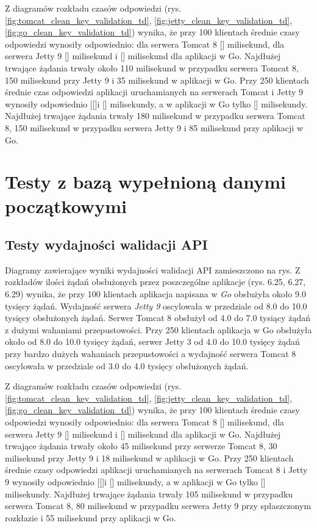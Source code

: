 Z diagramów rozkładu czasów odpowiedzi (rys. \ref{fig:tomcat_clean_key_validation_td}, \ref{fig:jetty_clean_key_validation_td}, \ref{fig:go_clean_key_validation_td}) wynika, że przy 100 klientach średnie czasy odpowiedzi wynosiły odpowiednio: dla serwera Tomcat 8 [] milisekund, dla serwera Jetty 9 [] milisekund i [] milisekund dla aplikacji w Go.  Najdłużej trwające żądania trwały około 110 milisekund w przypadku serwera Tomcat 8, 150 milisekund przy Jetty 9 i 35 milisekund  w aplikacji w Go. Przy 250 klientach średnie czas odpowiedzi aplikacji uruchamianych na serwerach Tomcat i Jetty 9  wynosiły  odpowiednio [[]i [] milisekundy, a w aplikacji w Go tylko [] milisekundy. Najdłużej trwające żądania trwały 180 milisekund w przypadku serwera Tomcat 8, 150 milisekund w przypadku serwera Jetty 9 i 85 milisekund przy aplikacji w Go. 

% 
\clearpage

\newpage
\section{Testy z bazą wypełnioną danymi początkowymi}
\subsection{Testy wydajności walidacji API}
Diagramy zawierające wyniki wydajności walidacji API zamieszczono na rys.
Z rozkładów ilości żądań obsłużonych przez poszczególne aplikacje (rys. 6.25, 6.27, 6.29) wynika, że przy 100 klientach aplikacja napisana w \textsl{Go} obsłużyła około 9.0 tysięcy żądań. Wydajność serwera  \textsl{Jetty 9} oscylowała w przedziale od 8.0 do 10.0 tysięcy obsłużonych żądań. Serwer Tomcat 8  obsłużył od 4.0 do 7.0 tysiący żądań z dużymi wahaniami przepustowości. Przy 250 klientach aplikacja w Go obsłużyła około od 8.0 do 10.0 tysięcy żądań, serwer Jetty 3 od 4.0 do 10.0 tysięcy żądań przy bardzo dużych wahaniach przepustowości a wydajność serwera Tomcat 8 oscylowała w przedziale od 3.0 do 4.0 tysięcy  obsłużonych żądań. 
 
Z diagramów rozkładu czasów odpowiedzi (rys. \ref{fig:tomcat_clean_key_validation_td}, \ref{fig:jetty_clean_key_validation_td}, \ref{fig:go_clean_key_validation_td}) wynika, że przy 100 klientach średnie czasy odpowiedzi wynosiły odpowiednio: dla serwera Tomcat 8 [] milisekund, dla serwera Jetty 9 [] milisekund i [] milisekund dla aplikacji w Go.  Najdłużej trwające żądania trwały około 45 milisekund przy serwerze Tomcat 8, 30 milisekund przy Jetty 9 i 18 milisekund  w aplikacji w Go. Przy 250 klientach średnie czasy odpowiedzi aplikacji uruchamianych na serwerach Tomcat 8 i Jetty 9  wynosiły odpowiednio [[]i [] milisekundy, a w aplikacji w Go tylko [] milisekundy. Najdłużej trwające żądania trwały 105 milisekund w przypadku serwera Tomcat 8, 80 milisekund w przypadku serwera Jetty 9 przy spłaszczonym rozkłazie i 55 milisekund przy aplikacji w Go. 

